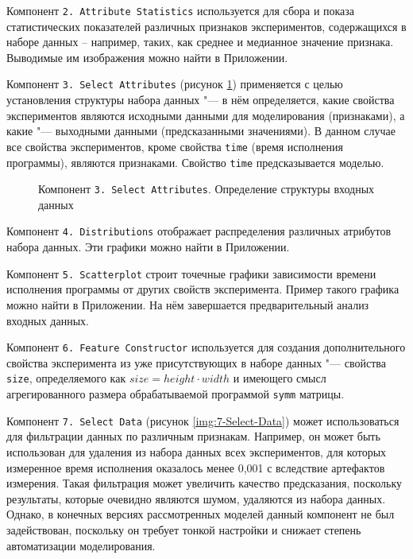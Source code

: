 Компонент \texttt{2.\,Attribute~Statistics} используется для сбора и показа статистических показателей различных признаков экспериментов, содержащихся в наборе данных -- например, таких, как среднее и медианное значение признака. Выводимые им изображения можно найти в Приложении.

Компонент \texttt{3.\,Select~Attributes} (рисунок \ref{img:3-Select-Attributes}) применяется с целью установления структуры набора данных "--- в нём определяется, какие свойства экспериментов являются исходными данными для моделирования (признаками), а какие "--- выходными данными (предсказанными значениями). В данном случае все свойства экспериментов, кроме свойства \texttt{time} (время исполнения программы), являются признаками. Свойство \texttt{time} предсказывается моделью.

\begin{figure}[tbp]
    \caption{Компонент \texttt{3.\,Select~Attributes}. Определение структуры входных данных}
    \label{img:3-Select-Attributes}
\end{figure}

Компонент \texttt{4.\,Distributions} отображает распределения различных атрибутов набора данных. Эти графики можно найти в Приложении.

Компонент \texttt{5.\,Scatterplot} строит точечные графики зависимости времени исполнения программы от других свойств эксперимента. Пример такого графика можно найти в Приложении. На нём завершается предварительный анализ входных данных.

Компонент \texttt{6.\,Feature Constructor} используется для создания дополнительного свойства эксперимента из уже присутствующих в наборе данных "--- свойства \texttt{size}, определяемого как $size = height \cdot width$ и имеющего смысл агрегированного размера обрабатываемой программой \texttt{symm} матрицы.

Компонент \texttt{7.\,Select~Data} (рисунок \ref{img:7-Select-Data}) может использоваться для фильтрации данных по различным признакам. Например, он может быть использован для удаления из набора данных всех экспериментов, для которых измеренное время исполнения оказалось менее 0,001 с вследствие артефактов измерения. Такая фильтрация может увеличить качество предсказания, поскольку результаты, которые очевидно являются шумом, удаляются из набора данных. Однако, в конечных версиях рассмотренных моделей данный компонент не был задействован, поскольку он требует тонкой настройки и снижает степень автоматизации моделирования.

